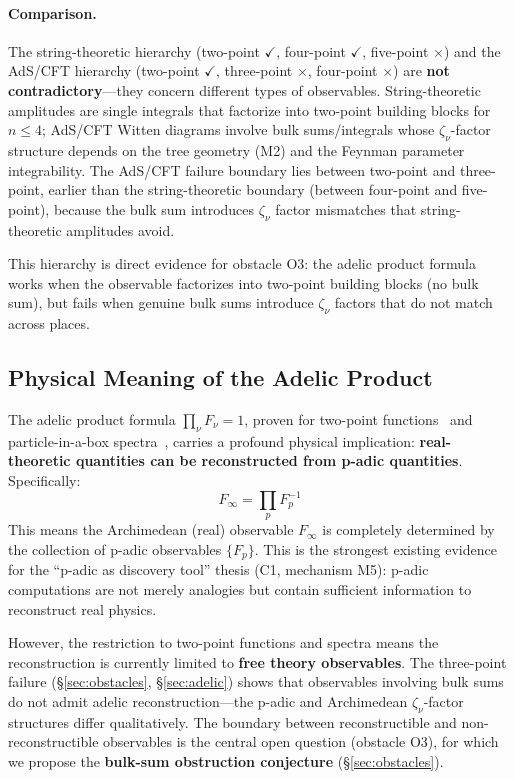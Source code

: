 \documentclass[11pt,a4paper]{article}
\begin{document}
\paragraph{Comparison.}
The string-theoretic hierarchy (two-point $\checkmark$, four-point $\checkmark$, five-point $\times$) and the AdS/CFT hierarchy (two-point $\checkmark$, three-point $\times$, four-point $\times$) are \textbf{not contradictory}---they concern different types of observables. String-theoretic amplitudes are single integrals that factorize into two-point building blocks for $n \leq 4$; AdS/CFT Witten diagrams involve bulk sums/integrals whose $\zeta_\nu$-factor structure depends on the tree geometry (M2) and the Feynman parameter integrability. The AdS/CFT failure boundary lies between two-point and three-point, earlier than the string-theoretic boundary (between four-point and five-point), because the bulk sum introduces $\zeta_\nu$ factor mismatches that string-theoretic amplitudes avoid.

This hierarchy is direct evidence for obstacle O3: the adelic product formula works when the observable factorizes into two-point building blocks (no bulk sum), but fails when genuine bulk sums introduce $\zeta_\nu$ factors that do not match across places.

\subsection{Physical Meaning of the Adelic Product}

The adelic product formula $\prod_\nu F_\nu = 1$, proven for two-point functions~\cite{HSYZ20} and particle-in-a-box spectra~\cite{HMS20}, carries a profound physical implication: \textbf{real-theoretic quantities can be reconstructed from p-adic quantities}. Specifically:
\begin{equation}
F_\infty = \prod_p F_p^{-1}
\end{equation}
This means the Archimedean (real) observable $F_\infty$ is completely determined by the collection of p-adic observables $\{F_p\}$. This is the strongest existing evidence for the ``p-adic as discovery tool'' thesis (C1, mechanism M5): p-adic computations are not merely analogies but contain sufficient information to reconstruct real physics.

However, the restriction to two-point functions and spectra means the reconstruction is currently limited to \textbf{free theory observables}. The three-point failure (\S\ref{sec:obstacles}, \S\ref{sec:adelic}) shows that observables involving bulk sums do not admit adelic reconstruction---the p-adic and Archimedean $\zeta_\nu$-factor structures differ qualitatively. The boundary between reconstructible and non-reconstructible observables is the central open question (obstacle O3), for which we propose the \textbf{bulk-sum obstruction conjecture} (\S\ref{sec:obstacles}).
\end{document}
